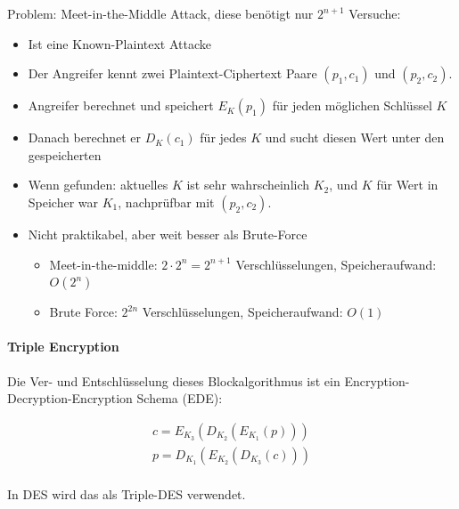 Problem: Meet-in-the-Middle Attack, diese benötigt nur $2^{n+1}$ Versuche:

\begin{itemize}
    \item Ist eine Known-Plaintext Attacke 
    \item Der Angreifer kennt zwei Plaintext-Ciphertext Paare $(p_1, c_1)$ und $(p_2, c_2)$.
    \item Angreifer berechnet und speichert $E_K(p_1)$ für jeden möglichen Schlüssel $K$
    \item Danach berechnet er $D_K(c_1)$ für jedes $K$ und sucht diesen Wert unter den gespeicherten
    \item Wenn gefunden: aktuelles $K$ ist sehr wahrscheinlich $K_2$, und $K$ für Wert in Speicher war $K_1$, nachprüfbar mit $(p_2, c_2)$.
    \item Nicht praktikabel, aber weit besser als Brute-Force
    \begin{itemize}
        \item Meet-in-the-middle: $2\cdot 2^n = 2^{n+1}$ Verschlüsselungen, Speicheraufwand: $O(2^n)$
        \item Brute Force: $2^{2n}$ Verschlüsselungen, Speicheraufwand: $O(1)$
    \end{itemize}
\end{itemize}

\paragraph{Triple Encryption}

Die Ver- und Entschlüsselung dieses Blockalgorithmus ist ein Encryption-Decryption-Encryption Schema (EDE):

\begin{align*}
    c = E_{K_3}\left( D_{K_2} \left( E_{K_1}(p) \right) \right) \\
    p = D_{K_1}\left( E_{K_2} \left( D_{K_3}(c) \right) \right) \\
\end{align*}

In DES wird das als Triple-DES verwendet.

